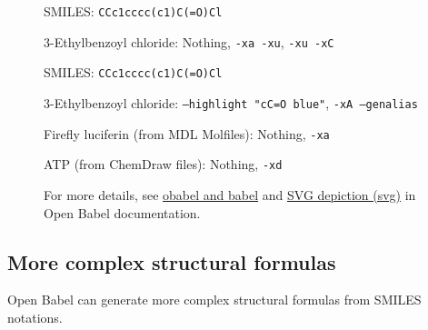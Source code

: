 \documentclass[12pt]{ltjsarticle}
\def\Lcode#1{\texttt{#1}}
\begin{document}
\begin{figure}[ht]
  \centering
   \hspace{1cm}
   \hspace{1cm}
  \caption{3-Ethylbenzoyl chloride: Nothing, \Lcode{-xa -xu}, \Lcode{-xu -xC}}
  SMILES: \verb|CCc1cccc(c1)C(=O)Cl|
\end{figure}

\begin{figure}[ht]
  \centering
   \hspace{1cm}
  \caption{3-Ethylbenzoyl chloride: \Lcode{--highlight "cC=O blue"}, \Lcode{-xA --genalias}}
  SMILES: \verb|CCc1cccc(c1)C(=O)Cl|
\end{figure}

\begin{figure}[ht]
  \centering
   \hspace{1cm}
  \caption{Firefly luciferin (from MDL Molfiles): Nothing, \Lcode{-xa}}
\end{figure}

\begin{figure}[ht]
  \centering
   \hspace{1cm}
  \caption{ATP (from ChemDraw files): Nothing, \Lcode{-xd}}
\end{figure}

\begin{figure}[ht]
For more details, see
\href{http://openbabel.org/docs/dev/Command-line_tools/babel.html}{obabel and babel}
and
\href{http://openbabel.org/docs/dev/FileFormats/SVG_2D_depiction.html}{SVG depiction (svg)}
in Open Babel documentation.
\end{figure}

\clearpage

\subsection{More complex structural formulas}

Open Babel can generate more complex structural formulas from SMILES notations.
\end{document}
